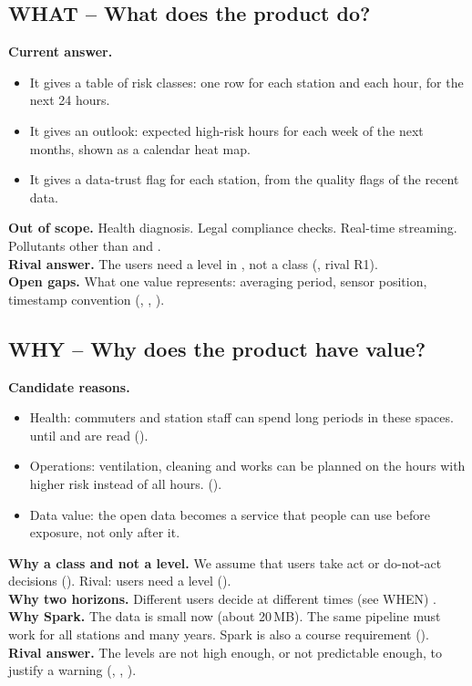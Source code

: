 \documentclass[11pt]{article}
\begin{document}
\subsection{WHAT -- What does the product do?}
\textbf{Current answer.} \tAssumed{}
\begin{itemize}
  \item It gives a table of risk classes: one row for each station and each hour, for the next 24 hours.
  \item It gives an outlook: expected high-risk hours for each week of the next months, shown as a calendar heat map.
  \item It gives a data-trust flag for each station, from the quality flags of the recent data.
\end{itemize}
\textbf{Out of scope.} Health diagnosis. Legal compliance checks. Real-time streaming. Pollutants other than \pmten{} and \pmtwofive.\\
\textbf{Rival answer.} The users need a level in \ugm, not a class (, rival R1).\\
\textbf{Open gaps.} What one value represents: averaging period, sensor position, timestamp convention (, , ).

\subsection{WHY -- Why does the product have value?}
\textbf{Candidate reasons.}
\begin{itemize}
  \item Health: commuters and station staff can spend long periods in these spaces. \tAssumed{} until  and  are read ().
  \item Operations: ventilation, cleaning and works can be planned on the hours with higher risk instead of all hours. \tAssumed{} ().
  \item Data value: the open data becomes a service that people can use before exposure, not only after it.
\end{itemize}
\textbf{Why a class and not a level.} We assume that users take act or do-not-act decisions \tAssumed{} (). Rival: users need a level ().\\
\textbf{Why two horizons.} Different users decide at different times (see WHEN) \tAssumed.\\
\textbf{Why Spark.} The data is small now (about 20\,MB). The same pipeline must work for all stations and many years. Spark is also a course requirement ().\\
\textbf{Rival answer.} The levels are not high enough, or not predictable enough, to justify a warning (, , ).
\end{document}
